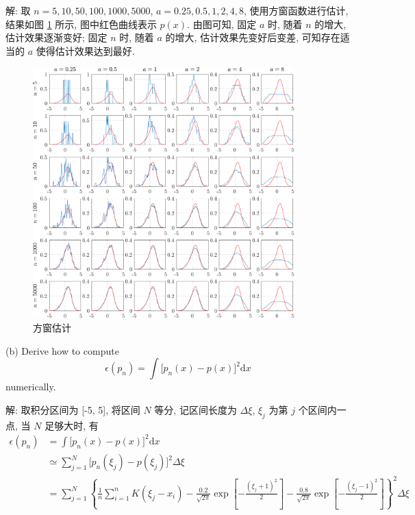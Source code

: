 \documentclass[openany]{ctexbook}
\theoremstyle{kaiti}
\theoremstyle{normal}
\begin{document}
解: 取 $n=5,10,50,100,1000,5000$, $a=0.25,0.5,1,2,4,8$, 使用方窗函数进行估计, 结果如图 \ref{fig:sqwin} 所示, 图中红色曲线表示 $p(x)$. 由图可知, 固定 $a$ 时, 随着 $n$ 的增大, 估计效果逐渐变好; 固定 $n$ 时, 随着 $a$ 的增大, 估计效果先变好后变差, 可知存在适当的 $a$ 使得估计效果达到最好.

\begin{figure}[htbp]
  \centering
  \includegraphics[width=0.9\textwidth]{squareWindow.pdf}
  \caption{方窗估计}
  \label{fig:sqwin}
\end{figure}

(b) Derive how to compute
\begin{equation}
  \epsilon(p_n)=\int\big[p_n(x)-p(x)\big]^2\mathrm{d}x
\end{equation}
numerically.

解: 取积分区间为 [-5, 5], 将区间 $N$ 等分, 记区间长度为 $\Delta \xi$, $\xi_j$ 为第 $j$ 个区间内一点, 当 $N$ 足够大时, 有
\begin{equation}
  \begin{aligned}
    \epsilon(p_n)
    &=\int\big[p_n(x)-p(x)\big]^2\mathrm{d}x\\
    &\simeq\sum_{j=1}^N\big[p_n(\xi_j)-p(\xi_j)\big]^2\Delta \xi\\
    &=\sum_{j=1}^N\left\{\frac{1}{n}\sum_{i=1}^nK(\xi_j-x_i)-\frac{0.2}{\sqrt{2\pi}}\exp\left[-\frac{(\xi_j+1)^2}{2}\right]-\frac{0.8}{\sqrt{2\pi}}\exp\left[-\frac{(\xi_j-1)^2}{2}\right]\right\}^2\Delta \xi\\
  \end{aligned}
\end{equation}
\end{document}

